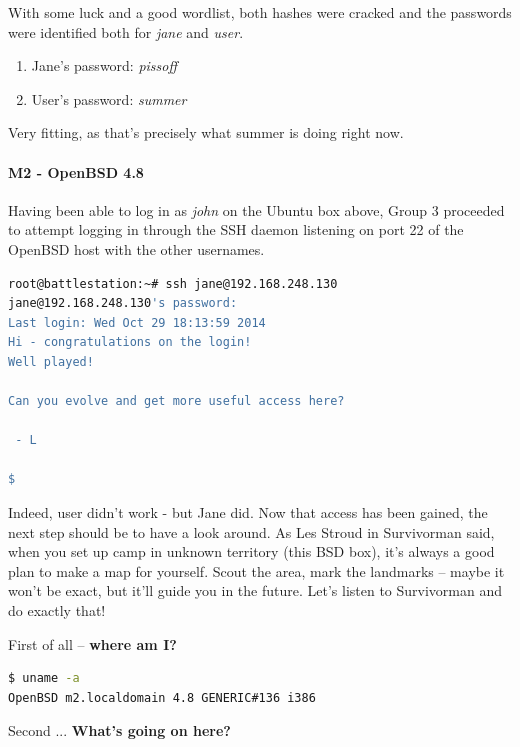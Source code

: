 With some luck and a good wordlist, both hashes were cracked and the passwords were identified both for \textit{jane} and \textit{user}.

\begin{enumerate}
	\item Jane's password: \textit{pissoff}
	\item User's password: \textit{summer}
\end{enumerate}

Very fitting, as that's precisely what summer is doing right now.

\paragraph{M2 - OpenBSD 4.8}
Having been able to log in as \textit{john} on the Ubuntu box above, Group 3 proceeded to attempt logging in through the SSH daemon listening on port 22 of the OpenBSD host with the other usernames. 

\begin{lstlisting}[language=bash,caption={SSH'ing into OpenBSD}]
root@battlestation:~# ssh jane@192.168.248.130
jane@192.168.248.130's password: 
Last login: Wed Oct 29 18:13:59 2014
Hi - congratulations on the login!
Well played!

Can you evolve and get more useful access here?

 - L

$
\end{lstlisting}

Indeed, user didn't work - but Jane did. Now that access has been gained, the next step should be to have a look around. As Les Stroud in Survivorman said, when you set up camp in unknown territory (this BSD box), it's always a good plan to make a map for yourself. Scout the area, mark the landmarks -- maybe it won't be exact, but it'll guide you in the future. Let's listen to Survivorman and do exactly that!

First of all -- \textbf{where am I?}
\begin{lstlisting}[language=bash,caption={Where are we standing?}]
$ uname -a
OpenBSD m2.localdomain 4.8 GENERIC#136 i386
\end{lstlisting}

Second ... \textbf{What's going on here?} 

